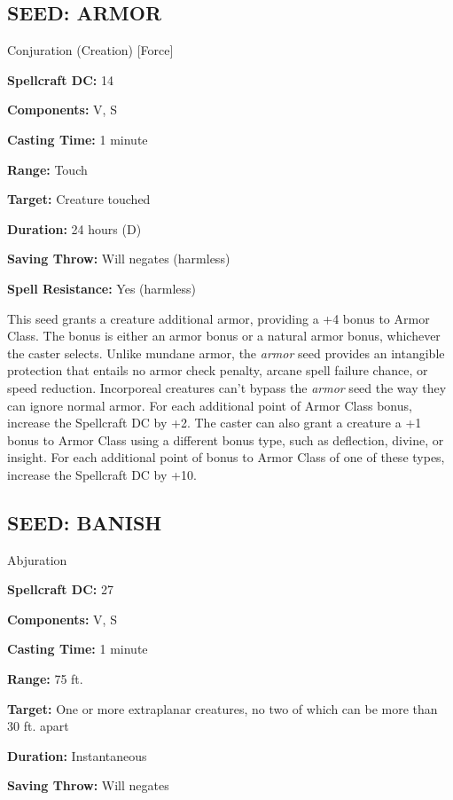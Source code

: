 \documentclass{article}
\begin{document}
\vspace{12pt}
\subsection*{SEED: ARMOR }

Conjuration (Creation) [Force] 

\textbf{Spellcraft DC:} 14 

\textbf{Components:} V, S 

\textbf{Casting Time:} 1 minute 

\textbf{Range:} Touch 

\textbf{Target:} Creature touched

\textbf{Duration:} 24 hours (D) 

\textbf{Saving Throw:} Will negates (harmless) 

\textbf{Spell Resistance:} Yes (harmless) 

This seed grants a creature additional armor, providing a +4 bonus to Armor Class. 
The bonus is either an armor bonus or a natural armor bonus, whichever the caster 
selects. Unlike mundane armor, the \textit{armor }seed provides an intangible protection 
that entails no armor check penalty, arcane spell failure chance, or speed reduction. 
Incorporeal creatures can't bypass the \textit{armor }seed the way they can ignore 
normal armor. For each additional point of Armor Class bonus, increase the Spellcraft 
DC by +2. The caster can also grant a creature a +1 bonus to Armor Class using 
a different bonus type, such as deflection, divine, or insight. For each additional 
point of bonus to Armor Class of one of these types, increase the Spellcraft DC 
by +10. 

\vspace{12pt}
\subsection*{SEED: BANISH }

Abjuration 

\textbf{Spellcraft DC:} 27 

\textbf{Components:} V, S 

\textbf{Casting Time:} 1 minute 

\textbf{Range:} 75 ft. 

\textbf{Target:} One or more extraplanar creatures, no two of which can be more 
than 30 ft. apart 

\textbf{Duration:} Instantaneous 

\textbf{Saving Throw:} Will negates 
\end{document}
